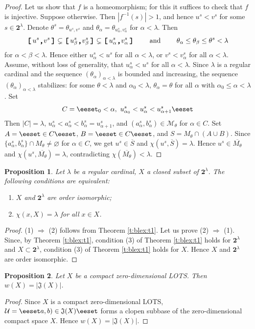 \documentclass[preprint]{elsarticle}
\def\be{\beta}
\def\al{\alpha}
\def\la{\lambda}
\def\cl#1{\overline{#1}}
\def\es{\varnothing}
\def\sset#1{\{#1\}}
\def\set#1{\bbset#1\eeset}
\def\bbset#1:#2\eeset{\{#1\,:\,#2\}}
\def\cM{{\mathcal M}}
\def\cU{{\mathcal U}}
\def\te{\theta}
\newtheorem{proposition}{Proposition}[section]
\theoremstyle{definition}
\theoremstyle{remark}
\def\rarr{\Rightarrow}
\def\lex#1#2{\mathfrak{L}(#2^{#1})}
\def\lex#1#2{#2^{#1}}
\def\B{2}
\def\B{\mathsf{2}}
\def\B{\mathbf{2}}
\def\ilcomma/{\boldsymbol{,}}
\def\ilsymlp{\boldsymbol{(}}
\def\ilsymrp{\boldsymbol{)}}
\def\ilsymlc{\boldsymbol{[}}
\def\ilsymrc{\boldsymbol{]}}
\def\ilfont#1{\boldsymbol{#1}}
\def\ilfontX#1{\mathrm{\text{\texttt{\textbf{\large #1}}}}}
\def\ilfontX#1{{\text{\texttt{\textbf{\large \upshape #1}}}}}
\def\ilfont#1{\raisebox{-1.2pt}{\ilfontX{#1}}}
\def\ilfontC#1{\raisebox{-0.7pt}{\ilfontX{#1}}}
\def\ilcomma/{\ilfontC{,}}
\def\ilsymlp{\ilfont{(}}
\def\ilsymrp{\ilfont{)}}
\def\ilsymlc{\ilfont{[}\,}
\def\ilsymrc{\,\ilfont{]}}
\def\ilpp(#1,#2){\ilsymlp#1\ilcomma/ #2\ilsymrp}
\def\ilcc[#1,#2]{\ilsymlc#1\ilcomma/ #2\ilsymrc}
\def\jumps#1{\mathfrak{J}(#1)}
\def\sq#1#2{(#1)_{#2}}
\def\lexab{\lex\la\B}
\begin{document}
\begin{proof}
Let us show that $f$ is a homeomorphism; for this it suffices to check that $f$ is injective. Suppose otherwise. Then $|f^{-1}(s)|>1$, and hence $u^s<v^s$ for some $s\in\lexab$.
%
Denote $\te^s=\te_{u^s,v^s}$ and $\te_\al=\te_{u_\al^s,v_\al^s}$ for $\al<\la$.
Then
\[
\ilcc[u^s,v^s] \subsetneq \ilcc[u^s_\be,v^s_\be] \subsetneq \ilcc[u^s_\al,v^s_\al]
\qquad\text{ and } \qquad \te_\al\leq \te_\be\leq  \te^s < \la
\]
for $\al< \be < \la$. 
Hence either $u^s_\al<u^s$ for all $\al<\la$, or $v^s<v^s_\al$ for all $\al<\la$. Assume, without loss of generality, that $u^s_\al<u^s$ for all $\al<\la$.
Since $\la$ is a regular cardinal and the sequence $\sq{\te_\al}{\al<\la}$ is bounded and increasing, the sequence $\sq{\te_\al}{\al<\la}$ stabilizes: for some $\te<\la$ and $\al_0<\la$, $\te_\al=\te$ for all $\al$ with $\al_0\leq \al < \la$. Set
\[
C=\set{ \al<\la: \al_0<\al,\ u^s_{\al_0} < u^s_{\al} < u^s_{\al+1} }
\]
Then $|C|=\la$, $u^s_{\al} < a^s_\al< b^s_\al=u^s_{\al+1}$, and $(a^s_\al,b^s_\al)\in \cM_\te$ for $\al\in C$.
Set $A=\set{a^s_\al:\al\in C}$, $B=\set{b^s_\al:\al\in C}$, and $S=M_\te\cap(A\cup B)$. Since $\sset{a^s_\al,b^s_\al}\cap M_\te\neq\es$ for $\al\in C$, we get $u^s\in \cl S$ and $\chi(u^s,\cl S)=\la$. Hence $u^s\in \cl{M_\te}$ and $\chi(u^s,\cl{M_\te})=\la$, contradicting $\chi(\cl{M_\te})<\la$.
\end{proof}

\begin{proposition}\label{p:blex:ct1}
Let $\la$ be a regular cardinal, $X$ a closed subset of $\lexab$.
The following conditions are equivalent:
\begin{enumerate}
\item
$X$ and $\lexab$ are order isomorphic;
\item
$\chi(x,X)=\la$ for all $x\in X$.
\end{enumerate}
\end{proposition}
\begin{proof}
(1) $\rarr$ (2) follows from Theorem \ref{t:blex:t1}.
Let us prove (2) $\rarr$ (1). Since, by Theorem \ref{t:blex:t1}, condition (3) of Theorem \ref{t:blex:t1} holds for $\lexab$ and $X\subset \lexab$, condition (3) of Theorem \ref{t:blex:t1} holds for $X$.
Hence $X$ and $\lexab$ are order isomorphic.
\end{proof}


\begin{proposition}\label{p:blex:3-1}
Let $X$ be a compact zero-dimensional LOTS. Then $w(X)=|\jumps X|$.
\end{proposition}
\begin{proof}
Since $X$ is a compact zero-dimensional LOTS, $\cU=\set{\ilpp(-\infty,a), \ilpp(b,+\infty): (a,b)\in \jumps X}$ forms a clopen subbase of the zero-dimensional compact space $X$. Hence $w(X)=|\jumps X|$.
\end{proof}
\end{document}
